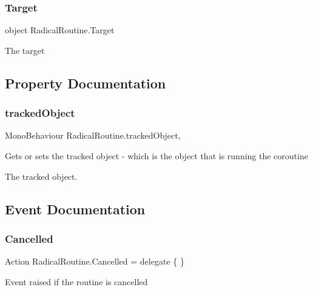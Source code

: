 \subsubsection{\texorpdfstring{Target}{Target}}
{\footnotesize\ttfamily object Radical\+Routine.\+Target}



The target 



\subsection{Property Documentation}
\mbox{\label{class_radical_routine_a235e7bd6879257332c2836c021bae75e}} 
\subsubsection{\texorpdfstring{tracked\+Object}{trackedObject}}
{\footnotesize\ttfamily Mono\+Behaviour Radical\+Routine.\+tracked\+Object\hspace{0.3cm}{\ttfamily [get]}, {\ttfamily [set]}}



Gets or sets the tracked object -\/ which is the object that is running the coroutine 

The tracked object. 

\subsection{Event Documentation}
\mbox{\label{class_radical_routine_ad10d1a30c327b9c8613b10c7a274a57e}} 
\subsubsection{\texorpdfstring{Cancelled}{Cancelled}}
{\footnotesize\ttfamily Action Radical\+Routine.\+Cancelled = delegate \{ \}}



Event raised if the routine is cancelled 

\mbox{\label{class_radical_routine_a4c372aa10c0c69be8156aa821ec7dd46}} 
